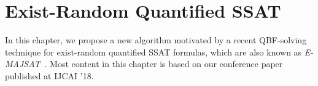 \chapter{Exist-Random Quantified SSAT}
\label{chap:exist-random-ssat}

In this chapter, we propose a new algorithm motivated by a recent QBF-solving technique for exist-random quantified SSAT formulas, which are also known as \textit{E-MAJSAT}~\cite{Littman1998}.
Most content in this chapter is based on our conference paper~\cite{LeeIJCAI18ERSSAT} published at IJCAI '18.



